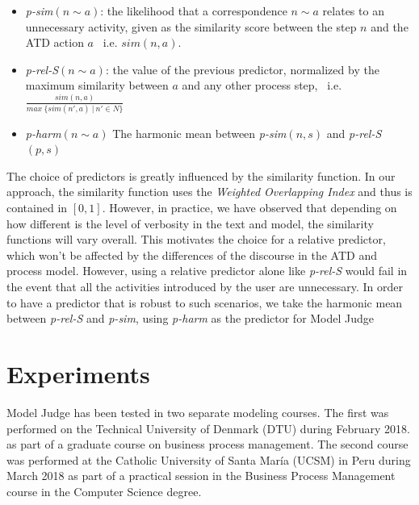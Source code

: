 \begin{itemize}
	\item \textit{p-sim}$(n \sim a)$: the likelihood that a correspondence $n \sim a$
    relates to an unnecessary activity, given as the similarity score between
    the step $n$ and the ATD action $a$~ i.e. $sim(n,a)$.
    
	\item \textit{p-rel-S}$(n \sim a)$: the value of the previous predictor,
    normalized by the maximum similarity between $a$ and any other process step,
    ~i.e. \\ $\frac{sim(n,a)}{max~\{sim(n', a)~|~n' \in N\}}$
    
  \item \textit{p-harm}$(n \sim a)$ The harmonic mean between \textit{p-sim}$(n,
    s)$ and \textit{p-rel-S}$(p,s)$
\end{itemize}


The choice of predictors is greatly influenced by the similarity function. In
our approach, the similarity function uses the \emph{Weighted Overlapping Index}
and thus is contained in $[0,1]$. However, in practice, we have observed that
depending on how different is the level of verbosity in the text and model, the
similarity functions will vary overall. This motivates the choice for a relative
predictor, which won't be affected by the differences of the discourse in the ATD and
process model. However, using a relative predictor alone like \textit{p-rel-S} would
fail in the event that all the activities introduced by the user are
unnecessary. In order to have a predictor that is robust to such scenarios, we
take the harmonic mean between \textit{p-rel-S} and \textit{p-sim}, using
\textit{p-harm} as the predictor for Model Judge

\section{Experiments}
\label{sec:modeljudge_results}


Model Judge has been tested in two separate modeling courses. The first was performed on the Technical University of Denmark (DTU) during February 2018. as part of a graduate course on business process management. 
The second course was performed at the Catholic University of Santa Mar\'ia (UCSM) in Peru during March 2018 as part of a practical session in the Business Process Management course in the Computer Science degree.

